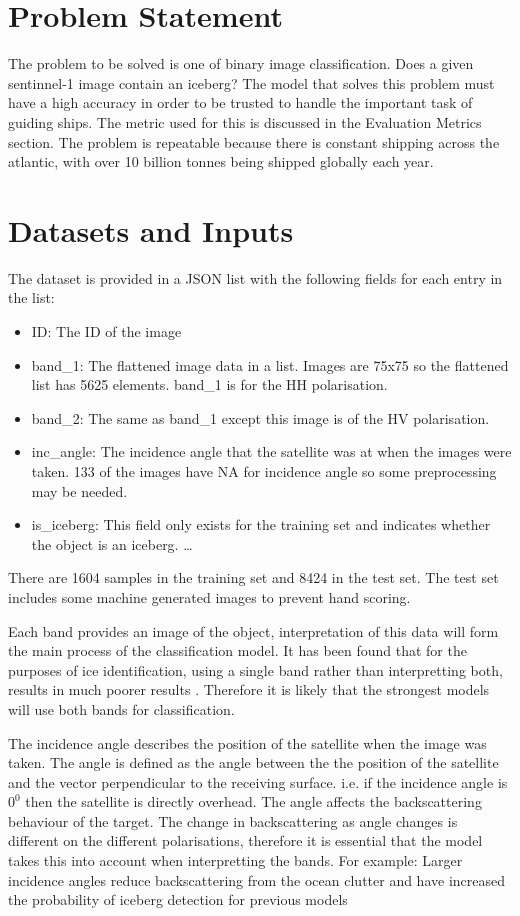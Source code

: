 \documentclass{article}
\begin{document}
\section{Problem Statement}
The problem to be solved is one of binary image classification. Does a given sentinnel-1 image contain an iceberg? The model that solves this problem must have a high accuracy in order to be trusted to handle the important task of guiding ships. The metric used for this is discussed in the Evaluation Metrics section. The problem is repeatable because there is constant shipping across the atlantic, with over 10 billion tonnes being shipped globally each year. \cite{unctad}


\section{Datasets and Inputs}
The dataset is provided in a JSON list with the following fields for each entry in the list:
\begin{itemize}
\item ID: The ID of the image
\item band\_1: The flattened image data in a list. Images are 75x75 so the flattened list has 5625 elements. band\_1 is for the HH polarisation.
\item band\_2: The same as band\_1 except this image is of the HV polarisation.
\item inc\_angle: The incidence angle that the satellite was at when the images were taken. 133 of the images have NA for incidence angle so some preprocessing may be needed.
\item is\_iceberg: This field only exists for the training set and indicates whether the object is an iceberg.
\ldots
\end{itemize}
There are 1604 samples in the training set and 8424 in the test set. The test set includes some machine generated images to prevent hand scoring. 

Each band provides an image of the object, interpretation of this data will form the main process of the classification model. It has been found that for the purposes of ice identification, using a single band rather than interpretting both, results in much poorer results \cite{radarsat-mode-selection,yu}. Therefore it is likely that the strongest models will use both bands for classification.

The incidence angle describes the position of the satellite when the image was taken. The angle is defined as the angle between the the position of the satellite and the vector perpendicular to the receiving surface. i.e. if the incidence angle is $0^0$ then the satellite is directly overhead. The angle affects the backscattering behaviour of the target. The change in backscattering as angle changes is different on the different polarisations, therefore it is essential that the model takes this into account when interpretting the bands. For example: Larger incidence angles reduce backscattering from the ocean clutter and have increased the probability of iceberg detection for previous models \cite{radarsat-mode-selection}
\end{document}
